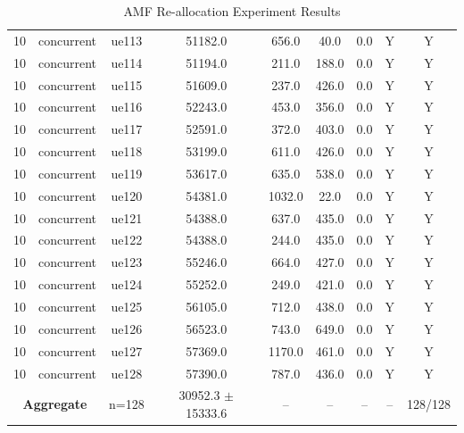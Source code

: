 \begin{table}[ht]
\begin{tabular}{|c|c|c|c|c|c|c|c|c|}
10 & concurrent & ue113 & 51182.0 & 656.0 & 40.0 & 0.0 & Y & Y \\
10 & concurrent & ue114 & 51194.0 & 211.0 & 188.0 & 0.0 & Y & Y \\
10 & concurrent & ue115 & 51609.0 & 237.0 & 426.0 & 0.0 & Y & Y \\
10 & concurrent & ue116 & 52243.0 & 453.0 & 356.0 & 0.0 & Y & Y \\
10 & concurrent & ue117 & 52591.0 & 372.0 & 403.0 & 0.0 & Y & Y \\
10 & concurrent & ue118 & 53199.0 & 611.0 & 426.0 & 0.0 & Y & Y \\
10 & concurrent & ue119 & 53617.0 & 635.0 & 538.0 & 0.0 & Y & Y \\
10 & concurrent & ue120 & 54381.0 & 1032.0 & 22.0 & 0.0 & Y & Y \\
10 & concurrent & ue121 & 54388.0 & 637.0 & 435.0 & 0.0 & Y & Y \\
10 & concurrent & ue122 & 54388.0 & 244.0 & 435.0 & 0.0 & Y & Y \\
10 & concurrent & ue123 & 55246.0 & 664.0 & 427.0 & 0.0 & Y & Y \\
10 & concurrent & ue124 & 55252.0 & 249.0 & 421.0 & 0.0 & Y & Y \\
10 & concurrent & ue125 & 56105.0 & 712.0 & 438.0 & 0.0 & Y & Y \\
10 & concurrent & ue126 & 56523.0 & 743.0 & 649.0 & 0.0 & Y & Y \\
10 & concurrent & ue127 & 57369.0 & 1170.0 & 461.0 & 0.0 & Y & Y \\
10 & concurrent & ue128 & 57390.0 & 787.0 & 436.0 & 0.0 & Y & Y \\
\multicolumn{2}{|c|}{\textbf{Aggregate}} & n=128 & 30952.3 $\pm$ 15333.6 & -- & -- & -- & -- & 128/128 \\
\hline
\end{tabular}
\caption{AMF Re-allocation Experiment Results}
\label{tab:amf_realloc}
\end{table}
